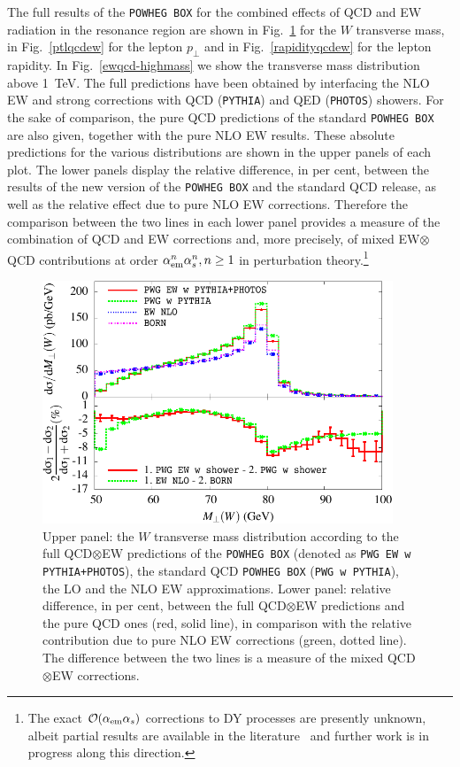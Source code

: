 \documentclass[11pt,a4paper]{article}
\newcommand\POWHEGBOX{\texttt{POWHEG BOX}}
\newcommand\aem{\alpha_{\rm em}}
\begin{document}
The full results of the \POWHEGBOX{} for the combined effects of QCD and EW radiation in the resonance region are shown in 
Fig.~\ref{mtwqcdew} for the 
$W$ transverse mass, in
Fig.~\ref{ptlqcdew} for the lepton $p_\perp$
and in Fig.~\ref{rapidityqcdew}  for the lepton rapidity.
In Fig.~\ref{ewqcd-highmass} we show
the transverse mass distribution above 1~TeV. The full predictions have been obtained by interfacing the NLO 
EW and strong corrections with 
QCD (\texttt{PYTHIA}) and QED (\texttt{PHOTOS}) showers.  For the sake of 
comparison, the pure QCD predictions of the standard 
\POWHEGBOX{} are also given, together with the 
pure NLO EW results. These absolute predictions for the various distributions are shown in the upper panels of each plot. 
The lower panels display the relative difference, in per cent, between the results of the new version of the \POWHEGBOX{} 
and the standard QCD release, as well as the relative effect due to pure NLO EW corrections. Therefore the comparison 
between the two lines in each lower panel provides a measure of the combination of QCD and EW corrections 
and, more precisely, of mixed EW$\otimes$QCD contributions at 
order $\aem^n \alpha_s^n, n \geq 1$ in perturbation theory.\footnote{The exact ${\cal O}(\aem\alpha_s)$ corrections to 
DY processes are presently unknown, albeit partial results 
are available in the literature~\cite{Kilgore:2011pa} and further work is in progress along this direction.}


\begin{figure}[hbtp]
\begin{center}
\includegraphics[height=7.25cm]{Fig3}
\caption{Upper panel: the $W$ transverse mass distribution according to the full QCD$\otimes$EW predictions of the 
\POWHEGBOX{} (denoted as {\tt PWG EW w PYTHIA+PHOTOS}), 
the standard QCD \POWHEGBOX{} ({\tt PWG w PYTHIA}), the LO and the NLO EW approximations. 
Lower panel: relative difference, in per cent, between the full QCD$\otimes$EW predictions and 
the pure QCD ones (red, solid line), in comparison with the relative contribution due to pure NLO EW corrections (green, dotted line). 
The difference between the two lines is
a measure of the mixed QCD$\otimes$EW corrections.}
\label{mtwqcdew}
\end{center}
\end{figure}
\end{document}
